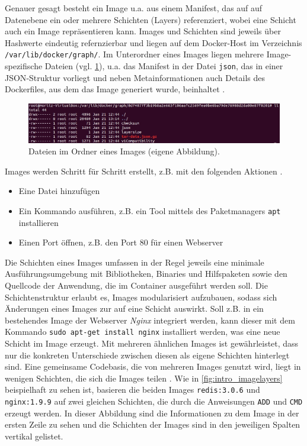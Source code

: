 \documentclass[../main.tex]{subfiles}
\begin{document}
			Genauer gesagt besteht ein Image u.a. aus einem Manifest, das auf auf Datenebene ein oder mehrere Schichten (Layers) referenziert, wobei eine Schicht auch ein Image repräsentieren kann. Images und Schichten sind jeweils über Hashwerte eindeutig refernzierbar und liegen auf dem Docker-Host im Verzeichnis \texttt{/var/lib/docker/graph/}. Im Unterordner eines Images liegen mehrere Image-spezifische Dateien (vgl. \fig \ref{fig:intro_dockerImageVZ}), u.a. das Manifest in der Datei \texttt{json}, das in einer \acrshort{JSON}-Struktur vorliegt und neben Metainformationen auch Details des Dockerfiles, aus dem das Image generiert wurde, beinhaltet \cite{githubDockerGlossary}.

			\begin{figure}[!htbp]
          \centering
          \includegraphics[width=1.0\textwidth]{./images/intro_dockerImageVZ.jpg}
          \caption{Dateien im Ordner eines Images (eigene Abbildung).}
          \label{fig:intro_dockerImageVZ}
      \end{figure}

			Images werden Schritt für Schritt erstellt, z.B. mit den folgenden Aktionen \cite[S.11]{dockerBook}.
			\begin{itemize}
				\item Eine Datei hinzufügen
				\item Ein Kommando ausführen, z.B. ein Tool mittels des Paketmanagers \texttt{apt} installieren
				\item Einen Port öffnen, z.B. den Port 80 für einen Webserver
			\end{itemize}

      Die Schichten eines Images umfassen in der Regel jeweils eine minimale Ausführungsumgebung mit Bibliotheken, Binaries und Hilfspaketen sowie den Quellcode der Anwendung, die im Container ausgeführt werden soll. Die Schichtenstruktur erlaubt es, Images modularisiert aufzubauen, sodass sich Änderungen eines Images zur auf eine Schicht auswirkt. Soll z.B. in ein bestehendes Image der Webserver \emph{Nginx} integriert werden, kann dieser mit dem Kommando \texttt{sudo apt-get install nginx} installiert werden, was eine neue Schicht im Image erzeugt. Mit mehreren ähnlichen Images ist gewährleistet, dass nur die konkreten Unterschiede zwischen diesen als eigene Schichten hinterlegt sind. Eine gemeinsame Codebasis, die von mehreren Images genutzt wird, liegt in wenigen Schichten, die sich die Images teilen \cite[S.3]{dockerIntroIEEE}. Wie in \fig \ref{fig:intro_imagelayers} beispielhaft zu sehen ist, basieren die beiden Images \texttt{redis:3.0.6} und \texttt{nginx:1.9.9} auf zwei gleichen Schichten, die durch die Anweisungen \texttt{ADD} und \texttt{CMD} erzeugt werden. In dieser Abbildung sind die Informationen zu dem Image in der ersten Zeile zu sehen und die Schichten der Images sind in den jeweiligen Spalten vertikal gelistet.
\end{document}
